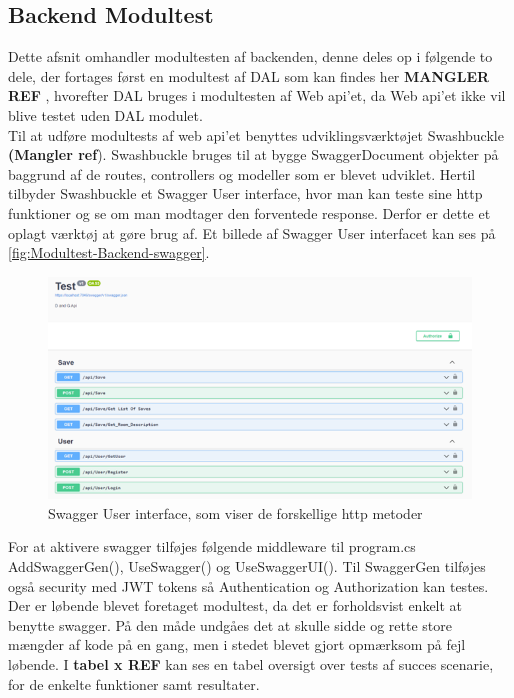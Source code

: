 \subsection{Backend Modultest}

Dette afsnit omhandler modultesten af backenden, denne deles op i følgende to dele, der fortages først en modultest af DAL som kan findes her \textbf{MANGLER REF} , hvorefter DAL bruges i modultesten af Web api’et, da Web api’et ikke vil blive testet uden DAL modulet.\\

Til at udføre modultests af web api’et benyttes udviklingsværktøjet Swashbuckle \textbf{(Mangler ref}). Swashbuckle bruges til at bygge SwaggerDocument objekter på baggrund af de routes, controllers og modeller som er blevet udviklet. Hertil tilbyder Swashbuckle et Swagger User interface, hvor man kan teste sine http funktioner og se om man modtager den forventede response. Derfor er dette et oplagt værktøj at gøre brug af. Et billede af Swagger User interfacet kan ses på \autoref{fig:Modultest-Backend-swagger}.\\

\begin{figure}[H]
\centering
\includegraphics[width = \textwidth]{02-Body/Images/Backend_swagger.PNG}
\caption{Swagger User interface, som viser de forskellige http metoder}
\label{fig:Modultest-Backend-swagger}
\end{figure}

For at aktivere swagger tilføjes følgende middleware til program.cs AddSwaggerGen(), UseSwagger() og UseSwaggerUI(). Til SwaggerGen tilføjes også security med JWT tokens så Authentication og Authorization kan testes.\\

Der er løbende blevet foretaget modultest, da det er forholdsvist enkelt at benytte swagger. På den måde undgåes det at skulle sidde og rette store mængder af kode på en gang, men i stedet blevet gjort opmærksom på fejl løbende. I \textbf{tabel x REF} kan ses en tabel oversigt over tests af succes scenarie, for de enkelte funktioner samt resultater.\\


